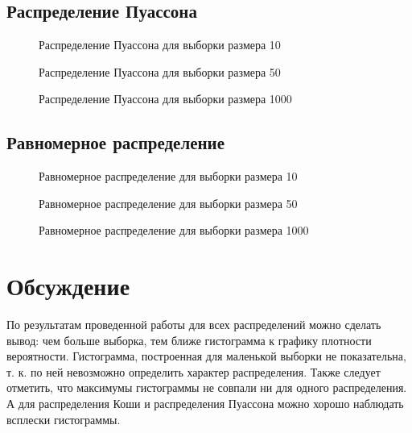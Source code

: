 \documentclass{article}
\begin{document}
\newpage
\subsection{Распределение Пуассона}
\begin{figure}[h]
\caption{Распределение Пуассона для выборки размера 10}
\end{figure}
\begin{figure}[h]
\caption{Распределение Пуассона для выборки размера 50}
\end{figure}
\begin{figure}[h]
\caption{Распределение Пуассона для выборки размера 1000}
\end{figure}

\newpage
\subsection{Равномерное распределение}
\begin{figure}[h]
\caption{Равномерное распределение для выборки размера 10}
\end{figure}
\begin{figure}[h]
\caption{Равномерное распределение для выборки размера 50}
\end{figure}
\begin{figure}[h]
\caption{Равномерное распределение для выборки размера 1000}
\end{figure}

\newpage
\section{Обсуждение}
По результатам проведенной работы для всех распределений можно сделать вывод: чем больше выборка, тем ближе гистограмма к графику плотности вероятности. Гистограмма, построенная для маленькой выборки не показательна, т. к. по ней невозможно определить характер распределения. Также следует отметить, что максимумы гистограммы не совпали ни для одного распределения. А для распределения Коши и распределения Пуассона можно хорошо наблюдать всплески гистограммы.
\end{document}
